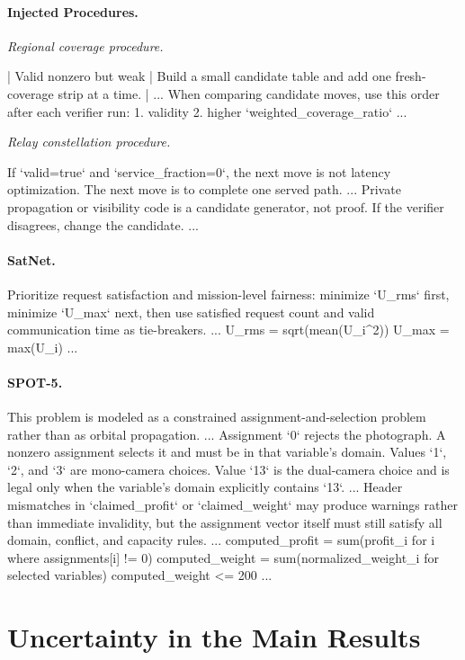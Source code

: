 \documentclass[]{mosi}
\newenvironment{promptblockcompact}
  {\VerbatimEnvironment\par\smallskip\Needspace{6\baselineskip}\noindent\begin{promptblockinnercompact}}
  {\end{promptblockinnercompact}\par\smallskip}
\newcommand{\promptheadingcompact}[1]{\Needspace{4\baselineskip}\paragraph{#1}\mbox{}\par}
\begin{document}
\promptheadingcompact{Injected Procedures.}
\emph{Regional coverage procedure.}
\begin{promptblockcompact}
| Valid nonzero but weak | Build a small candidate table and add one
fresh-coverage strip at a time. |
...
When comparing candidate moves, use this order after each verifier run:
1. validity
2. higher `weighted_coverage_ratio`
...
\end{promptblockcompact}

\emph{Relay constellation procedure.}
\begin{promptblockcompact}
If `valid=true` and `service_fraction=0`, the next move is not latency
optimization. The next move is to complete one served path.
...
Private propagation or visibility code is a candidate generator, not proof. If
the verifier disagrees, change the candidate.
...
\end{promptblockcompact}

\promptheadingcompact{SatNet.}
\begin{promptblockcompact}
Prioritize request satisfaction and mission-level fairness: minimize `U_rms`
first, minimize `U_max` next, then use satisfied request count and valid
communication time as tie-breakers.
...
U_rms = sqrt(mean(U_i^2))
U_max = max(U_i)
...
\end{promptblockcompact}

\promptheadingcompact{SPOT-5.}
\begin{promptblockcompact}
This problem is modeled as a constrained assignment-and-selection problem
rather than as orbital propagation.
...
Assignment `0` rejects the photograph. A nonzero assignment selects it and
must be in that variable's domain. Values `1`, `2`, and `3` are mono-camera
choices. Value `13` is the dual-camera choice and is legal only when the
variable's domain explicitly contains `13`.
...
Header mismatches in `claimed_profit` or `claimed_weight` may produce warnings
rather than immediate invalidity, but the assignment vector itself must still
satisfy all domain, conflict, and capacity rules.
...
computed_profit = sum(profit_i for i where assignments[i] != 0)
computed_weight = sum(normalized_weight_i for selected variables)
computed_weight <= 200
...
\end{promptblockcompact}

\section{Uncertainty in the Main Results}
\label{app:score-uncertainty}
\end{document}

